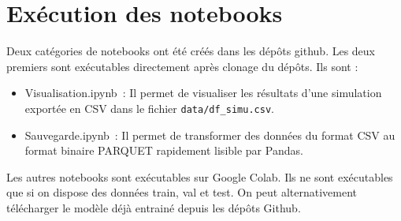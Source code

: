 \section{Exécution des notebooks}
Deux catégories de notebooks ont été créés dans les dépôts github. Les deux premiers sont exécutables directement après clonage du dépôts. Ils sont :
\begin{itemize}
 \item Visualisation.ipynb : Il permet de visualiser les résultats d'une simulation exportée en CSV dans le fichier \verb|data/df_simu.csv|.
 \item Sauvegarde.ipynb : Il permet de transformer des données du format CSV au format binaire PARQUET rapidement lisible par Pandas.
\end{itemize}

Les autres notebooks sont exécutables sur Google Colab. Ils ne sont exécutables que si on dispose des données train, val et test. On peut alternativement télécharger le modèle déjà entrainé depuis les dépôts Github.
